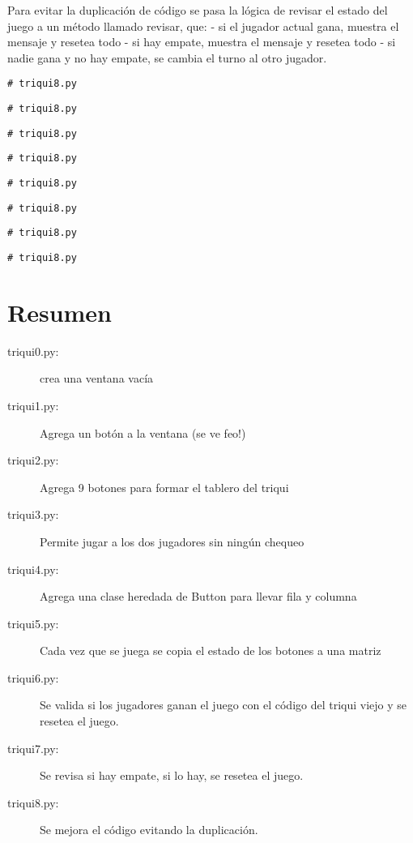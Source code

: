  Para evitar la duplicación de código se pasa la lógica de revisar el
 estado del juego a un método llamado revisar, que:
 - si el jugador actual gana, muestra el mensaje y resetea todo
 - si hay empate, muestra el mensaje y resetea todo
 - si nadie gana y no hay empate, se cambia el turno al otro jugador.
 

\beforeverb
\begin{verbatim}
# triqui8.py
\end{verbatim}
\afterverb

\beforeverb
\begin{verbatim}
# triqui8.py
\end{verbatim}
\afterverb

\beforeverb
\begin{verbatim}
# triqui8.py
\end{verbatim}
\afterverb

\beforeverb
\begin{verbatim}
# triqui8.py
\end{verbatim}
\afterverb

\beforeverb
\begin{verbatim}
# triqui8.py
\end{verbatim}
\afterverb

\beforeverb
\begin{verbatim}
# triqui8.py
\end{verbatim}
\afterverb

\beforeverb
\begin{verbatim}
# triqui8.py
\end{verbatim}
\afterverb

\beforeverb
\begin{verbatim}
# triqui8.py
\end{verbatim}
\afterverb

\section{Resumen}

\begin{description}

\item[triqui0.py:] crea una ventana vacía
\item[triqui1.py:] Agrega un botón a la ventana (se ve feo!)
\item[triqui2.py:] Agrega 9 botones para formar el tablero del triqui
\item[triqui3.py:] Permite jugar a los dos jugadores sin ningún chequeo
\item[triqui4.py:] Agrega una clase heredada de Button para llevar fila y columna 
\item[triqui5.py:] Cada vez que se juega se copia el estado de los botones a una matriz
\item[triqui6.py:] Se valida si los jugadores ganan el juego con el código del triqui viejo
	    y se resetea el juego.
\item[triqui7.py:] Se revisa si hay empate, si lo hay, se resetea el juego.
\item[triqui8.py:] Se mejora el código evitando la duplicación.
\end{description}

